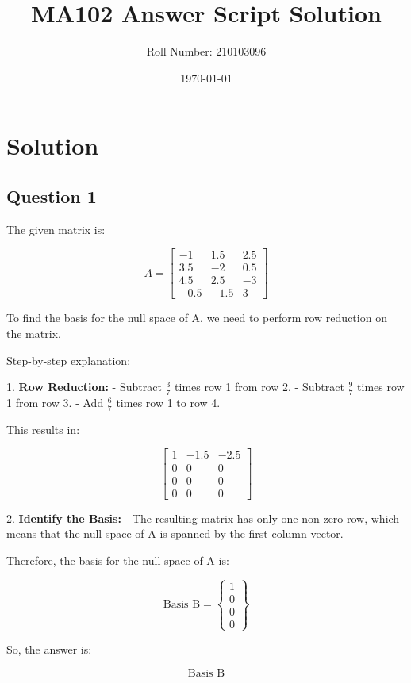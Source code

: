\documentclass[12pt]{article}
\title{MA102 Answer Script Solution}
\author{Roll Number: 210103096}
\date{\today}
\begin{document}
\maketitle
\section*{Solution}

\subsection*{Question 1}

The given matrix is:

\[
A = \left[\begin{array}{ccc}
-1 & 1.5 & 2.5 \\
3.5 & -2 & 0.5 \\
4.5 & 2.5 & -3 \\
-0.5 & -1.5 & 3
\end{array}\right]
\]

To find the basis for the null space of A, we need to perform row reduction on the matrix.

Step-by-step explanation:

1. \textbf{Row Reduction:}
   - Subtract \( \frac{3}{7} \) times row 1 from row 2.
   - Subtract \( \frac{9}{7} \) times row 1 from row 3.
   - Add \( \frac{6}{7} \) times row 1 to row 4.

This results in:

\[
\left[\begin{array}{ccc}
1 & -1.5 & -2.5 \\
0 & 0 & 0 \\
0 & 0 & 0 \\
0 & 0 & 0
\end{array}\right]
\]

2. \textbf{Identify the Basis:}
   - The resulting matrix has only one non-zero row, which means that the null space of A is spanned by the first column vector.

Therefore, the basis for the null space of A is:

\[
\text{Basis B} = \left\{\begin{array}{c}
1 \\
0 \\
0 \\
0
\end{array}\right\}
\]

So, the answer is:

\[
\boxed{\text{Basis B}}
\]
\end{document}
